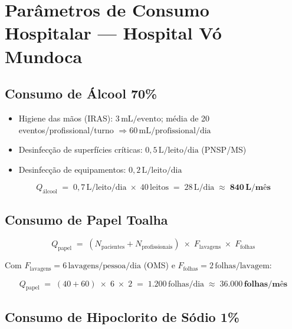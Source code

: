 \documentclass[12pt,a4paper]{article}
\begin{document}
\section{Parâmetros de Consumo Hospitalar --- Hospital Vó Mundoca}

\subsection{Consumo de Álcool 70\%}

\begin{itemize}
  \item Higiene das mãos (IRAS): $3\,\text{mL/evento}$; média de 20 eventos/profissional/turno $\Rightarrow 60\,\text{mL/profissional/dia}$
  \item Desinfecção de superfícies críticas: $0{,}5\,\text{L/leito/dia}$ (PNSP/MS)
  \item Desinfecção de equipamentos: $0{,}2\,\text{L/leito/dia}$
\end{itemize}

\begin{formulabox}
\[
  Q_{\text{álcool}} \;=\; 0{,}7\,\text{L/leito/dia} \;\times\; 40\,\text{leitos}
  \;=\; 28\,\text{L/dia} \;\approx\; \mathbf{840\,\text{L/mês}}
\]
\end{formulabox}

\subsection{Consumo de Papel Toalha}

\begin{formulabox}
\[
  Q_{\text{papel}} \;=\; (N_{\text{pacientes}} + N_{\text{profissionais}})
  \;\times\; F_{\text{lavagens}} \;\times\; F_{\text{folhas}}
\]
\end{formulabox}

\noindent Com $F_{\text{lavagens}} = 6\,\text{lavagens/pessoa/dia}$ (OMS) e $F_{\text{folhas}} = 2\,\text{folhas/lavagem}$:

\begin{formulabox}
\[
  Q_{\text{papel}} \;=\; (40 + 60) \;\times\; 6 \;\times\; 2
  \;=\; 1.200\,\text{folhas/dia} \;\approx\; \mathbf{36.000\,\text{folhas/mês}}
\]
\end{formulabox}

\subsection{Consumo de Hipoclorito de Sódio 1\%}
\end{document}
